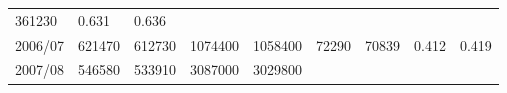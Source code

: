 \documentclass[
  spanish,
]{article}
\begin{document}
\begin{longtable}[]{@{}lllllllll@{}}
\begin{minipage}[t]{0.09\columnwidth}
361230\strut
\end{minipage} & \begin{minipage}[t]{0.08\columnwidth}\raggedright
0.631\strut
\end{minipage} & \begin{minipage}[t]{0.09\columnwidth}\raggedright
0.636\strut
\end{minipage}\tabularnewline
\begin{minipage}[t]{0.06\columnwidth}\raggedright
2006/07\strut
\end{minipage} & \begin{minipage}[t]{0.09\columnwidth}\raggedright
621470\strut
\end{minipage} & \begin{minipage}[t]{0.10\columnwidth}\raggedright
612730\strut
\end{minipage} & \begin{minipage}[t]{0.09\columnwidth}\raggedright
1074400\strut
\end{minipage} & \begin{minipage}[t]{0.10\columnwidth}\raggedright
1058400\strut
\end{minipage} & \begin{minipage}[t]{0.08\columnwidth}\raggedright
72290\strut
\end{minipage} & \begin{minipage}[t]{0.09\columnwidth}\raggedright
70839\strut
\end{minipage} & \begin{minipage}[t]{0.08\columnwidth}\raggedright
0.412\strut
\end{minipage} & \begin{minipage}[t]{0.09\columnwidth}\raggedright
0.419\strut
\end{minipage}\tabularnewline
\begin{minipage}[t]{0.06\columnwidth}\raggedright
2007/08\strut
\end{minipage} & \begin{minipage}[t]{0.09\columnwidth}\raggedright
546580\strut
\end{minipage} & \begin{minipage}[t]{0.10\columnwidth}\raggedright
533910\strut
\end{minipage} & \begin{minipage}[t]{0.09\columnwidth}\raggedright
3087000\strut
\end{minipage} & \begin{minipage}[t]{0.10\columnwidth}\raggedright
3029800\strut
\end{minipage} & \begin{minipage}[t]{0.08\columnwidth}\raggedright

\end{minipage}
\end{longtable}
\end{document}
